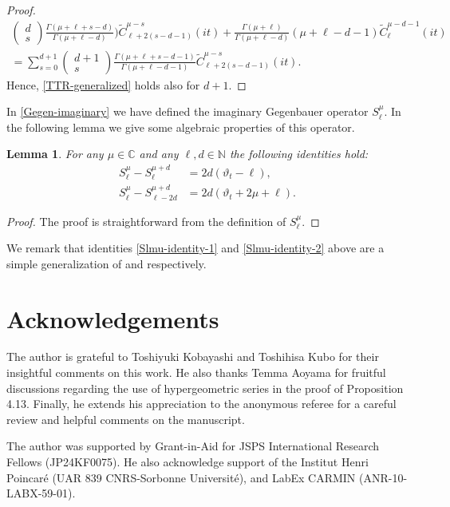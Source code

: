 \documentclass[12pt, pdflatex, a4paper]{article}
\theoremstyle{plain}
\newtheorem{lemma}[thm]{Lemma}
\theoremstyle{definition}
\def\C{{\mathbb C}}
\def\Geg{\widetilde{C}}
\def\N{{\mathbb N}}
\begin{document}
\begin{proof}
\begin{align*}
\begin{pmatrix}
d\\
s
\end{pmatrix}
\frac{\Gamma\left(\mu+\ell+s-d\right)}{\Gamma\left(\mu+\ell-d\right)}
\Bigg)\Geg_{\ell+2(s-d-1)}^{\mu-s}(it) + 
\frac{\Gamma\left(\mu+\ell\right)}{\Gamma\left(\mu+\ell-d\right)}(\mu+\ell-d-1)\Geg_{\ell}^{\mu-d-1}(it)\\
= \sum_{s=0}^{d+1}
\begin{pmatrix}
d+1\\
s
\end{pmatrix}
\frac{\Gamma\left(\mu+\ell+s-d-1\right)}{\Gamma\left(\mu+\ell-d-1\right)}\Geg_{\ell+2(s-d-1)}^{\mu-s}(it).
\end{align*}
Hence, \eqref{TTR-generalized} holds also for $d+1$.
\end{proof}

In \eqref{Gegen-imaginary} we have defined the imaginary Gegenbauer operator $S_\ell^\mu$. In the following lemma we give some algebraic properties of this operator.

\begin{lemma} For any $\mu \in \C$ and any $\ell, d \in \N$ the following identities hold:
\begin{align}
\label{Slmu-identity-1}
S_\ell^{\mu} - S_\ell^{\mu+d} &=  2d(\vartheta_t-\ell),\\
\label{Slmu-identity-2}
S_\ell^\mu - S_{\ell -2d}^{\mu + d} &= 2d(\vartheta_t + 2\mu + \ell).
\end{align}
\end{lemma}
\begin{proof}
The proof is straightforward from the definition of $S_\ell^\mu$.
\end{proof}
We remark that identities \eqref{Slmu-identity-1} and \eqref{Slmu-identity-2} above are a simple generalization of 
\cite[Eq. (14.9)]{KKP16} and \cite[Eq. (14.12)]{KKP16} respectively.

\section*{Acknowledgements}
The author is grateful to Toshiyuki Kobayashi and Toshihisa Kubo for their insightful comments on this work. He also thanks Temma Aoyama for fruitful discussions regarding the use of hypergeometric series in the proof of Proposition 4.13.
Finally, he extends his appreciation to the anonymous referee for a careful review and helpful comments on the manuscript.

The author was supported by Grant-in-Aid for JSPS International Research Fellows (JP24KF0075). He also acknowledge support of the Institut Henri Poincaré (UAR 839 CNRS-Sorbonne Université), and LabEx CARMIN (ANR-10-LABX-59-01).
\end{document}
